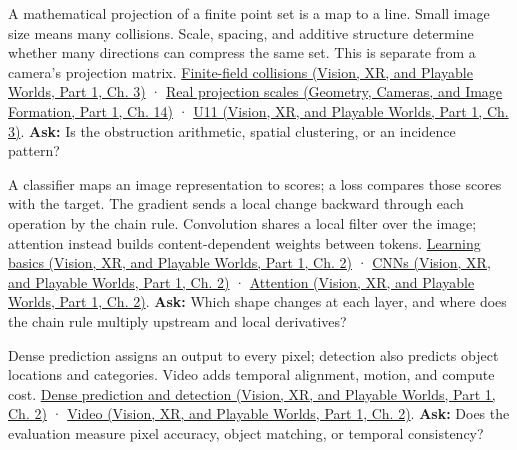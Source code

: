 A mathematical projection of a finite point set is a map to a line. Small image size means many collisions. Scale, spacing, and additive structure determine whether many directions can compress the same set. This is separate from a camera's projection matrix. \href{../07-Vision-XR-and-Playable-Worlds-P01/main.pdf\#nameddest=04-visual-computing-ii-ch032-finite-field-projections-turn-image-size-into-collision-counts}{Finite-field collisions (Vision, XR, and Playable Worlds, Part 1, Ch. 3)} · \href{../03-Geometry-Cameras-and-Image-Formation-P01/main.pdf\#nameddest=04-visual-computing-ii-ch033-real-projections-add-scale-spacing-and-incidence-geometry}{Real projection scales (Geometry, Cameras, and Image Formation, Part 1, Ch. 14)} · \href{../07-Vision-XR-and-Playable-Worlds-P01/main.pdf\#nameddest=04-visual-computing-ii-ch032-figure-u11---finite-grid-projections-expose-collision-counts}{U11 (Vision, XR, and Playable Worlds, Part 1, Ch. 3)}. \textbf{Ask:} Is the obstruction arithmetic, spatial clustering, or an incidence pattern?

A classifier maps an image representation to scores; a loss compares those scores with the target. The gradient sends a local change backward through each operation by the chain rule. Convolution shares a local filter over the image; attention instead builds content-dependent weights between tokens. \href{../07-Vision-XR-and-Playable-Worlds-P01/main.pdf\#nameddest=04-visual-computing-ii-ch031-learning-a-visual-classifier-from-examples}{Learning basics (Vision, XR, and Playable Worlds, Part 1, Ch. 2)} · \href{../07-Vision-XR-and-Playable-Worlds-P01/main.pdf\#nameddest=04-visual-computing-ii-ch031-convolutional-models-preserve-image-neighborhoods}{CNNs (Vision, XR, and Playable Worlds, Part 1, Ch. 2)} · \href{../07-Vision-XR-and-Playable-Worlds-P01/main.pdf\#nameddest=04-visual-computing-ii-ch031-sequence-models-and-attention}{Attention (Vision, XR, and Playable Worlds, Part 1, Ch. 2)}. \textbf{Ask:} Which shape changes at each layer, and where does the chain rule multiply upstream and local derivatives?

Dense prediction assigns an output to every pixel; detection also predicts object locations and categories. Video adds temporal alignment, motion, and compute cost. \href{../07-Vision-XR-and-Playable-Worlds-P01/main.pdf\#nameddest=04-visual-computing-ii-ch031-predict-pixels-and-localize-objects}{Dense prediction and detection (Vision, XR, and Playable Worlds, Part 1, Ch. 2)} · \href{../07-Vision-XR-and-Playable-Worlds-P01/main.pdf\#nameddest=04-visual-computing-ii-ch031-video-adds-motion-and-temporal-cost}{Video (Vision, XR, and Playable Worlds, Part 1, Ch. 2)}. \textbf{Ask:} Does the evaluation measure pixel accuracy, object matching, or temporal consistency?

